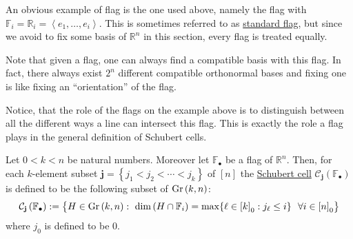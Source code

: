 An obvious example of flag is the one used above, namely the flag with $\mathbb{F}_i=\mathbb{R}_i=\left<e_1,\ldots,e_i\right>$. This is sometimes referred to as \ul{standard flag}, but since we avoid to fix some basis of $\mathbb{R}^n$ in this section, every flag is treated equally.

Note that given a flag, one can always find a compatible basis with this flag. In fact, there always exist $2^n$ different compatible orthonormal bases and fixing one is like fixing an ``orientation'' of the flag.

Notice, that the role of the flags on the example above is to distinguish between all the different ways a line can intersect this flag. This is exactly the role a flag plays in the general definition of Schubert cells.

\begin{definition} Let $0<k<n$ be natural numbers. Moreover let $\mathbb{F}_{\bullet}$ be a flag of $\mathbb{R}^n$. Then, for each $k$-element subset $\mathbf{j}=\left\{j_1<j_2<\cdots<j_k\right\}$ of $[n]$ the \ul{Schubert cell} $\mathcal{C}_{\mathbf{j}}\left(\mathbb{F}_{\bullet}\right)$ is defined to be the following subset of $\Gr{k}{n}$:
\[\mathcal{C}_{\mathbf{j}}\left(\mathbb{F}_{\bullet}\right):=\big\{H\in\Gr{k}{n}:\ \dim\left(H\cap\mathbb{F}_i\right)=\max\{\ell\in{[k]}_0:j_{\ell}\leq i\}\ \ \forall i\in{[n]}_0\big\}\]
where $j_0$ is defined to be $0$.
\end{definition}

